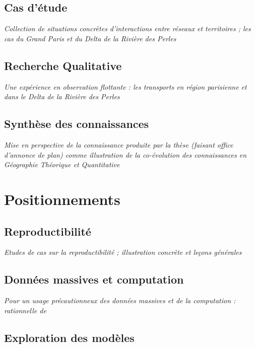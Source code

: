 \subsection{Cas d'étude}

\textit{Collection de situations concrètes d'interactions entre réseaux et territoires ; les cas du Grand Paris et du Delta de la Rivière des Perles} 


\subsection{Recherche Qualitative}

\textit{Une expérience en observation flottante : les transports en région parisienne et dans le Delta de la Rivière des Perles} 

\subsection{Synthèse des connaissances}

\textit{Mise en perspective de la connaissance produite par la thèse (faisant office d'annonce de plan) comme illustration de la co-évolution des connaissances en Géographie Théorique et Quantitative~\cite{raimbault2017theo}}




\section{Positionnements}


\subsection{Reproductibilité}

\textit{Etudes de cas sur la reproductibilité ; illustration concrète et leçons générales}

\subsection{Données massives et computation}

\textit{Pour un usage précautionneux des données massives et de la computation : rationnelle de~\cite{raimbault2016cautious}}


\subsection{Exploration des modèles}

